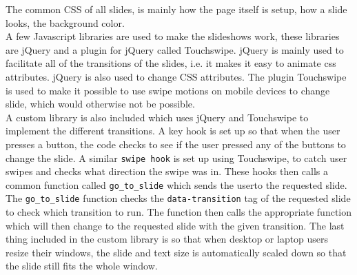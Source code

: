 The common CSS of all slides, is mainly how the page itself is setup, how a slide looks, the background color.\\

A few Javascript libraries are used to make the slideshows work, these libraries are jQuery and a plugin for jQuery called Touchswipe. jQuery is mainly used to facilitate all of the transitions of the slides, i.e. it makes it easy to animate css attributes. jQuery is also used to change CSS attributes. The plugin Touchswipe is used to make it possible to use swipe motions on mobile devices to change slide, which would otherwise not be possible. \\

A custom library is also included which uses jQuery and Touchswipe to implement the different transitions. A key hook is set up so that when the user presses a button, the code checks to see if the user pressed any of the buttons to change the slide. A similar \texttt{swipe hook} is set up using Touchswipe, to catch user swipes and checks what direction the swipe was in. These hooks then calls a common function called \texttt{go\_to\_slide} which sends the userto the requested slide. The \texttt{go\_to\_slide} function checks the \texttt{data-transition} tag of the requested slide to check which transition to run. The function then calls the appropriate function which will then change to the requested slide with the given transition. The last thing included in the custom library is so that when desktop or laptop users resize their windows, the slide and text size is automatically scaled down so that the slide still fits the whole window.\\

